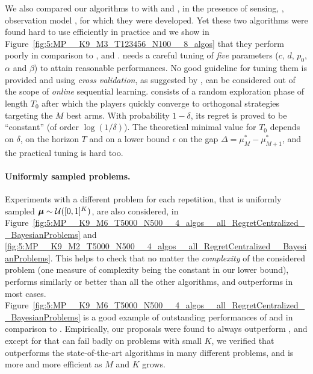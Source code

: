 We also compared our algorithms to  %
with \MEGA{} \citep{Avner15} and \MusicalChair{} \citep{Rosenski16}, in the presence of sensing, \ie, observation model \modeldeux, for which they were developed.
Yet these two algorithms were found hard to use efficiently in practice and we show in
%
Figure~\ref{fig:5:MP__K9_M3_T123456_N100__8_algos} that they perform poorly in comparison to \rhoRand, \RandTopM{} and \MCTopM.
%
\MEGA{} needs a careful tuning of \emph{five} parameters ($c$, $d$, $p_0$, $\alpha$ and $\beta$) to attain reasonable performances. No good guideline for tuning them is provided and using \emph{cross validation}, as suggested by \cite{Avner15},
can be considered out of the scope of \emph{online} sequential learning.
%
\MusicalChair{} consists of a random exploration phase of length $T_0$ after which the players quickly converge to orthogonal strategies targeting the $M$ best arms. With probability $1-\delta$, its regret is proved to be ``constant'' (of order $\log(1/\delta)$). The theoretical minimal value for $T_0$ depends on $\delta$, on the horizon $T$ and on a lower bound $\epsilon$ on the gap $\Delta = \mu^*_M - \mu^*_{M+1}$, and the practical tuning is hard too. %


\paragraph{Uniformly sampled problems.}
%
Experiments with a different problem for each repetition,
that is uniformly sampled $\boldsymbol{\mu} \sim \mathcal{U}([0,1]^K)$,
are also considered, in Figure~\ref{fig:5:MP__K9_M6_T5000_N500__4_algos__all_RegretCentralized__BayesianProblems} and \ref{fig:5:MP__K9_M2_T5000_N500__4_algos__all_RegretCentralized__BayesianProblems}.
This helps to check that no matter the \emph{complexity} of the considered problem (one measure of complexity being the constant in our lower bound),
\MCTopM{} performs similarly or better than all the other algorithms,
and \Selfish{} outperforms \rhoRand{} in most cases.
Figure~\ref{fig:5:MP__K9_M6_T5000_N500__4_algos__all_RegretCentralized__BayesianProblems} is a good example
of outstanding performances of \MCTopM{} and \Selfish{} in comparison to \rhoRand{}.
%
Empirically, our proposals were found to always outperform \rhoRand{}, and except for \Selfish{} that can fail badly on problems with small $K$,
we verified that \MCTopM{} outperforms the state-of-the-art algorithms in many different problems, and is more and more efficient as $M$ and $K$ grows.

